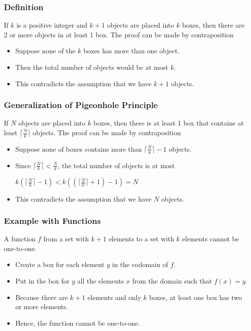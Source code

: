 \documentclass{article}
\begin{document}
\subsubsection{Definition} If $ k $ is a positive integer and $ k + 1 $ objects are placed into $ k $ boxes, then there are 2 or more objects in at least 1 box. The proof can be made by contraposition

\begin{tcolorbox}
\begin{itemize}
\item Suppose none of the $ k $ boxes has more than one object.
\item Then the total number of objects would be at most $ k $.
\item This contradicts the assumption that we have $ k + 1 $ objects.
\end{itemize}
\end{tcolorbox}

\subsubsection{Generalization of Pigeonhole Principle} If $ N $ objects are placed into $ k $ boxes, then there is at least 1 box that contains at least $ \lceil \frac{N}{k} \rceil $ objects. The proof can be made by contraposition

\begin{tcolorbox}
\begin{itemize}
\item Suppose none of boxes contains more than $ \lceil \frac{N}{k} \rceil - 1 $ objects.
\item Since $ \lceil \frac{N}{k} \rceil < \frac{N}{k} $, the total number of objects is at most
\begin{center}
$ k(\lceil \frac{N}{k} \rceil - 1) < k((\lceil \frac{N}{k} \rceil + 1) - 1) = N $
\end{center}
\item This contradicts the assumption that we have $ N $ objects.
\end{itemize}
\end{tcolorbox}

\subsubsection{Example with Functions} A function $ f $ from a set with $ k + 1 $ elements to a set with $ k $ elements cannot be one-to-one.
\begin{itemize}
\item Create a box for each element $ y $ in the codomain of $ f $.
\item Put in the box for $ y $ all the elements $ x $ from the domain such that $ f(x) = y $.
\item Because there are $ k + 1 $ elements and only $ k $ boxes, at least one box has two or more elements.
\item Hence, the function cannot be one-to-one.
\end{itemize}
\end{document}
